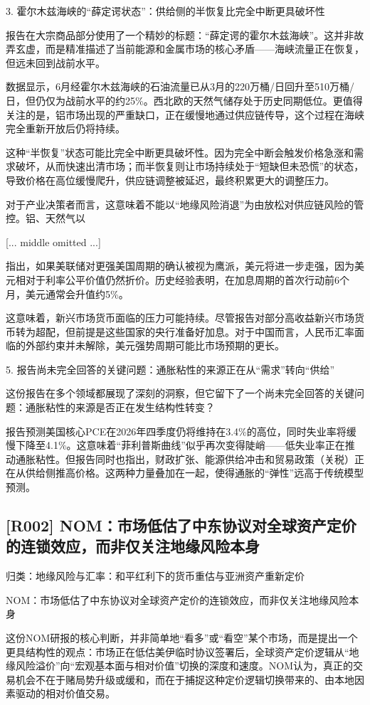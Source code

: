 \documentclass[11pt]{ctexart}
\begin{document}
3. 霍尔木兹海峡的“薛定谔状态”：供给侧的半恢复比完全中断更具破坏性

报告在大宗商品部分使用了一个精妙的标题：“薛定谔的霍尔木兹海峡”。这并非故弄玄虚，而是精准描述了当前能源和金属市场的核心矛盾——海峡流量正在恢复，但远未回到战前水平。

数据显示，6月经霍尔木兹海峡的石油流量已从3月的220万桶/日回升至510万桶/日，但仍仅为战前水平的约25\%。西北欧的天然气储存处于历史同期低位。更值得关注的是，铝市场出现的严重缺口，正在缓慢地通过供应链传导，这个过程在海峡完全重新开放后仍将持续。

这种“半恢复”状态可能比完全中断更具破坏性。因为完全中断会触发价格急涨和需求破坏，从而快速出清市场；而半恢复则让市场持续处于“短缺但未恐慌”的状态，导致价格在高位缓慢爬升，供应链调整被延迟，最终积累更大的调整压力。

对于产业决策者而言，这意味着不能以“地缘风险消退”为由放松对供应链风险的管控。铝、天然气以

[... middle omitted ...]

指出，如果美联储对更强美国周期的确认被视为鹰派，美元将进一步走强，因为美元相对于利率公平价值仍然折价。历史经验表明，在加息周期的首次行动前6个月，美元通常会升值约5\%。

这意味着，新兴市场货币面临的压力可能持续。尽管报告对部分高收益新兴市场货币转为超配，但前提是这些国家的央行准备好加息。对于中国而言，人民币汇率面临的外部约束并未解除，美元强势周期可能比市场预期的更长。

5. 报告尚未完全回答的关键问题：通胀粘性的来源正在从“需求”转向“供给”

这份报告在多个领域都展现了深刻的洞察，但它留下了一个尚未完全回答的关键问题：通胀粘性的来源是否正在发生结构性转变？

报告预测美国核心PCE在2026年四季度仍将维持在3.4\%的高位，同时失业率将缓慢下降至4.1\%。这意味着“菲利普斯曲线”似乎再次变得陡峭——低失业率正在推动通胀粘性。但报告同时也指出，财政扩张、能源供给冲击和贸易政策（关税）正在从供给侧推高价格。这两种力量叠加在一起，使得通胀的“弹性”远高于传统模型预测。

\subsection{[R002] NOM：市场低估了中东协议对全球资产定价的连锁效应，而非仅关注地缘风险本身}
{\small\color{refgray}归类：地缘风险与汇率：和平红利下的货币重估与亚洲资产重新定价}

NOM：市场低估了中东协议对全球资产定价的连锁效应，而非仅关注地缘风险本身

这份NOM研报的核心判断，并非简单地“看多”或“看空”某个市场，而是提出一个更具结构性的观点：市场正在低估美伊临时协议签署后，全球资产定价逻辑从“地缘风险溢价”向“宏观基本面与相对价值”切换的深度和速度。NOM认为，真正的交易机会不在于赌局势升级或缓和，而在于捕捉这种定价逻辑切换带来的、由本地因素驱动的相对价值交易。
\end{document}
